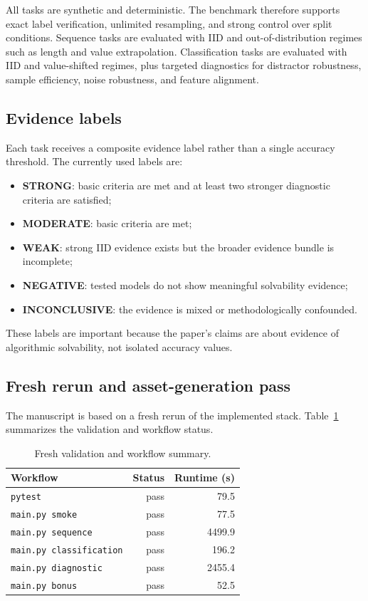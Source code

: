 \documentclass[11pt]{article}
\begin{document}
All tasks are synthetic and deterministic. The benchmark therefore supports exact label verification, unlimited resampling, and strong control over split conditions. Sequence tasks are evaluated with IID and out-of-distribution regimes such as length and value extrapolation. Classification tasks are evaluated with IID and value-shifted regimes, plus targeted diagnostics for distractor robustness, sample efficiency, noise robustness, and feature alignment.

\subsection{Evidence labels}

Each task receives a composite evidence label rather than a single accuracy threshold. The currently used labels are:

\begin{itemize}
  \item \textbf{STRONG}: basic criteria are met and at least two stronger diagnostic criteria are satisfied;
  \item \textbf{MODERATE}: basic criteria are met;
  \item \textbf{WEAK}: strong IID evidence exists but the broader evidence bundle is incomplete;
  \item \textbf{NEGATIVE}: tested models do not show meaningful solvability evidence;
  \item \textbf{INCONCLUSIVE}: the evidence is mixed or methodologically confounded.
\end{itemize}

These labels are important because the paper's claims are about evidence of algorithmic solvability, not isolated accuracy values.

\subsection{Fresh rerun and asset-generation pass}

The manuscript is based on a fresh rerun of the implemented stack. Table~\ref{tab:runtimes} summarizes the validation and workflow status.

\begin{table}[H]
\centering
\caption{Fresh validation and workflow summary.}
\label{tab:runtimes}
\begin{tabular}{lrr}
\toprule
Workflow & Status & Runtime (s) \\
\midrule
\texttt{pytest} & pass & 79.5 \\
\texttt{main.py smoke} & pass & 77.5 \\
\texttt{main.py sequence} & pass & 4499.9 \\
\texttt{main.py classification} & pass & 196.2 \\
\texttt{main.py diagnostic} & pass & 2455.4 \\
\texttt{main.py bonus} & pass & 52.5 \\
\bottomrule
\end{tabular}
\end{table}
\end{document}
